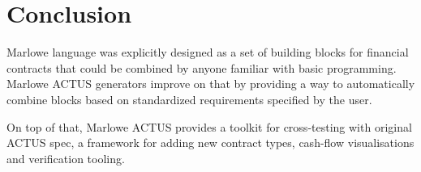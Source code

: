 \documentclass[runningheads]{llncs}
\begin{document}
\section{Conclusion}
\label{conclusion}

Marlowe language was explicitly designed as a set of building blocks
for financial contracts that could be combined by anyone familiar
with basic programming. Marlowe ACTUS generators improve on that by
providing a way to automatically combine blocks based on standardized
requirements specified by the user.

On top of that, Marlowe ACTUS provides a toolkit for cross-testing
with original ACTUS spec, a framework for adding new contract types,
cash-flow visualisations and verification tooling.

%
%
%


%
\end{document}
